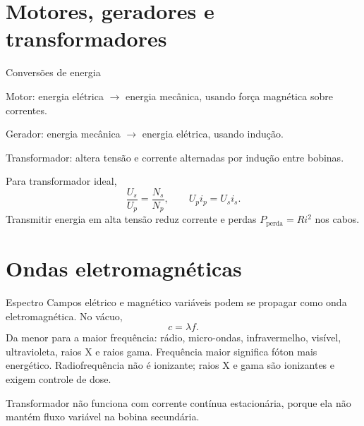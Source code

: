 \documentclass{notaaula}
\begin{document}
\section{Motores, geradores e transformadores}

\begin{copiar}{Conversões de energia}
\begin{itens}
\item Motor: energia elétrica $\rightarrow$ energia mecânica, usando força magnética sobre correntes.
\item Gerador: energia mecânica $\rightarrow$ energia elétrica, usando indução.
\item Transformador: altera tensão e corrente alternadas por indução entre bobinas.
\end{itens}
Para transformador ideal,
\[
  \frac{U_s}{U_p}=\frac{N_s}{N_p},
  \qquad U_pi_p=U_si_s.
\]
Transmitir energia em alta tensão reduz corrente e perdas $P_{\mathrm{perda}}=Ri^2$ nos cabos.
\end{copiar}

\section{Ondas eletromagnéticas}

\begin{copiar}{Espectro}
Campos elétrico e magnético variáveis podem se propagar como onda eletromagnética. No vácuo,
\[
  c=\lambda f.
\]
Da menor para a maior frequência: rádio, micro-ondas, infravermelho, visível, ultravioleta, raios X
e raios gama. Frequência maior significa fóton mais energético. Radiofrequência não é ionizante;
raios X e gama são ionizantes e exigem controle de dose.
\end{copiar}

\begin{dica}
Transformador não funciona com corrente contínua estacionária, porque ela não mantém fluxo variável
na bobina secundária.
\end{dica}
\end{document}
